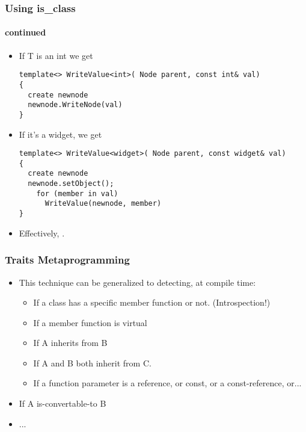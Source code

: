 \begin{frame}[fragile,t]
\frametitle{Using is\_class}
\framesubtitle{continued}
\begin{itemize}[<+->]

\item If T is an int we get
{\scriptsize\begin{verbatim}
template<> WriteValue<int>( Node parent, const int& val)
{
  create newnode
  newnode.WriteNode(val)
}
\end{verbatim}
}
\item If it's a widget, we get
{\scriptsize\begin{verbatim}
template<> WriteValue<widget>( Node parent, const widget& val)
{
  create newnode
  newnode.setObject();
    for (member in val)
      WriteValue(newnode, member)
}
\end{verbatim}
}
\item Effectively, .
\end{itemize}


\end{frame}


\begin{frame}[fragile,t]
\frametitle{Traits Metaprogramming}
\begin{itemize}[<+->]
\item This technique can be generalized to detecting, at compile time:
\begin{itemize}[<+->]
\item If a class has a specific member function or not.  (Introspection!)
\item If a member function is virtual
\item If A inherits from B
\item If A and B both inherit from C.
\item If a function parameter is a reference, or const, or a
  const-reference, or...
\end{itemize}
\item If A is-convertable-to B
\item ...
\end{itemize}
\end{frame}
